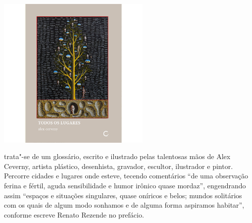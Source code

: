 \vfill

\hspace*{-.4cm}\begin{minipage}[c]{.5\linewidth}
\small{
{}}
\end{minipage}

\pagebreak %


\begin{center}
\hspace*{.5cm}\includegraphics[width=74mm]{./grid/lugares.jpg}
\end{center}

\hspace*{-7cm}\hrulefill\hspace*{-7cm}

\medskip

 trata"-se de um glossário, escrito e ilustrado pelas talentosas mãos de Alex Ceverny, artista plástico, desenhista, gravador, escultor, ilustrador e pintor. Percorre cidades e lugares onde esteve, tecendo comentários “de uma observação ferina e fértil, aguda sensibilidade e humor irônico quase mordaz”, engendrando assim “espaços e situações singulares, quase oníricos e belos; mundos solitários com os quais de algum modo sonhamos e de alguma forma aspiramos habitar”, conforme escreve Renato Rezende no prefácio.

